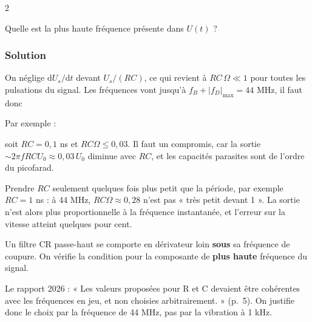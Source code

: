 \documentclass[11pt,a4paper]{article}
\newcommand{\equationajustee}[1]{%
  \sbox{\boiteequation}{$\displaystyle #1$}%
  \ifdim\wd\boiteequation>\linewidth
    \[\resizebox{\linewidth}{!}{\usebox{\boiteequation}}\]%
  \else
    \[#1\]%
  \fi}
\begin{document}
\begin{indication}{2}

Quelle est la plus haute fréquence présente dans \(U(t)\) ?

\end{indication}

\hypertarget{solution-53}{%
\subsubsection{Solution}\label{solution-53}}

On néglige \(\mathrm{d}U_s/\mathrm{d}t\) devant \(U_s/(RC)\), ce qui revient à \(RC\,\Omega\ll1\) pour toutes les pulsations du signal. Les fréquences vont jusqu'à \(f_B+|f_D|_{\max}=44\) MHz, il faut donc

\equationajustee{RC\ll\frac1{2\pi\times44\times10^6}\approx3{,}6\ \mathrm{ns}.}

Par exemple :

\equationajustee{\boxed{R=10\ \Omega}}

\equationajustee{\boxed{C=10\ \mathrm{pF}}}

soit \(RC=0{,}1\) ns et \(RC\Omega\le0{,}03\). Il faut un compromis, car la sortie \(\sim2\pi fRCU_0\approx0{,}03\,U_0\) diminue avec \(RC\), et les capacités parasites sont de l'ordre du picofarad.

\begin{piege}

Prendre \(RC\) seulement quelques fois plus petit que la période, par exemple \(RC=1\) ns : à 44 MHz, \(RC\Omega\approx0{,}28\) n'est pas « très petit devant 1 ». La sortie n'est alors plus proportionnelle à la fréquence instantanée, et l'erreur sur la vitesse atteint quelques pour cent.

\end{piege}

\begin{methode}

Un filtre CR passe-haut se comporte en dérivateur loin \textbf{sous} sa fréquence de coupure. On vérifie la condition pour la composante de \textbf{plus haute} fréquence du signal.

\end{methode}

\begin{jury}

Le rapport 2026 : « Les valeurs proposées pour R et C devaient être cohérentes avec les fréquences en jeu, et non choisies arbitrairement. » (p.~5). On justifie donc le choix par la fréquence de 44 MHz, pas par la vibration à 1 kHz.

\end{jury}
\end{document}
